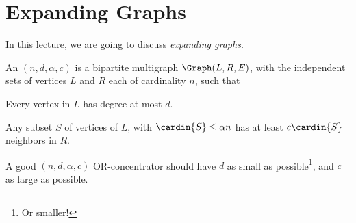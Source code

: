 \makeatletter
{}
\makeatother
\ifx\bookMode\undefined%
\fi
{}

\ChapterPrefix{}
\ChapterGen{}







\section{Expanding Graphs}

In this lecture, we are going to discuss {\em expanding graphs}.

\begin{defn}
    An $(n,d,\alpha, c)$  is a bipartite
    multigraph $\Graph(L, R, E)$, with the independent sets of
    vertices $L$ and $R$ each of cardinality $n$, such that
    \begin{compactenumi}
        \item Every vertex in $L$ has degree at most $d$.
        
        \item Any subset $S$ of vertices of $L$, with $\cardin{S} \leq
        \alpha n$ has at least $c \cardin{S}$ neighbors in $R$.
    \end{compactenumi}
\end{defn}

A good $(n,d,\alpha, c)$ OR-concentrator should have $d$ as small as
possible\footnote{Or smaller!}, and $c$ as large as possible.


